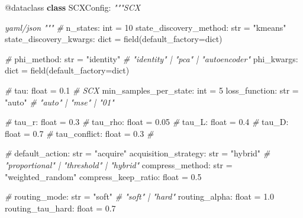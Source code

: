 \documentclass[
  12pt,
]{article}
\newenvironment{Shaded}{}{}
\newcommand{\AttributeTok}[1]{\textcolor[rgb]{0.49,0.56,0.16}{#1}}
\newcommand{\BuiltInTok}[1]{\textcolor[rgb]{0.00,0.50,0.00}{#1}}
\newcommand{\CommentTok}[1]{\textcolor[rgb]{0.38,0.63,0.69}{\textit{#1}}}
\newcommand{\DecValTok}[1]{\textcolor[rgb]{0.25,0.63,0.44}{#1}}
\newcommand{\FloatTok}[1]{\textcolor[rgb]{0.25,0.63,0.44}{#1}}
\newcommand{\KeywordTok}[1]{\textcolor[rgb]{0.00,0.44,0.13}{\textbf{#1}}}
\newcommand{\NormalTok}[1]{#1}
\newcommand{\OperatorTok}[1]{\textcolor[rgb]{0.40,0.40,0.40}{#1}}
\newcommand{\StringTok}[1]{\textcolor[rgb]{0.25,0.44,0.63}{#1}}
\begin{document}
\begin{Shaded}
\begin{Highlighting}[]
\AttributeTok{@dataclass}
\KeywordTok{class}\NormalTok{ SCXConfig:}
    \CommentTok{"""SCX }

\CommentTok{     yaml/json }
\CommentTok{    """}
    \CommentTok{\# }
\NormalTok{    n\_states: }\BuiltInTok{int} \OperatorTok{=} \DecValTok{10}
\NormalTok{    state\_discovery\_method: }\BuiltInTok{str} \OperatorTok{=} \StringTok{"kmeans"}
\NormalTok{    state\_discovery\_kwargs: }\BuiltInTok{dict} \OperatorTok{=}\NormalTok{ field(default\_factory}\OperatorTok{=}\BuiltInTok{dict}\NormalTok{)}

    \CommentTok{\# }
\NormalTok{    phi\_method: }\BuiltInTok{str} \OperatorTok{=} \StringTok{"identity"}   \CommentTok{\# "identity" | "pca" | "autoencoder"}
\NormalTok{    phi\_kwargs: }\BuiltInTok{dict} \OperatorTok{=}\NormalTok{ field(default\_factory}\OperatorTok{=}\BuiltInTok{dict}\NormalTok{)}

    \CommentTok{\# }
\NormalTok{    tau: }\BuiltInTok{float} \OperatorTok{=} \FloatTok{0.1}              \CommentTok{\# SCX }
\NormalTok{    min\_samples\_per\_state: }\BuiltInTok{int} \OperatorTok{=} \DecValTok{5}
\NormalTok{    loss\_function: }\BuiltInTok{str} \OperatorTok{=} \StringTok{"auto"}   \CommentTok{\# "auto" | "mse" | "01"}

    \CommentTok{\# }
\NormalTok{    tau\_r: }\BuiltInTok{float} \OperatorTok{=} \FloatTok{0.3}            \CommentTok{\# }
\NormalTok{    tau\_rho: }\BuiltInTok{float} \OperatorTok{=} \FloatTok{0.05}         \CommentTok{\# }
\NormalTok{    tau\_L: }\BuiltInTok{float} \OperatorTok{=} \FloatTok{0.4}            \CommentTok{\# }
\NormalTok{    tau\_D: }\BuiltInTok{float} \OperatorTok{=} \FloatTok{0.7}            \CommentTok{\# }
\NormalTok{    tau\_conflict: }\BuiltInTok{float} \OperatorTok{=} \FloatTok{0.3}     \CommentTok{\# }

    \CommentTok{\# }
\NormalTok{    default\_action: }\BuiltInTok{str} \OperatorTok{=} \StringTok{"acquire"}
\NormalTok{    acquisition\_strategy: }\BuiltInTok{str} \OperatorTok{=} \StringTok{"hybrid"}   \CommentTok{\# "proportional" | "threshold" | "hybrid"}
\NormalTok{    compress\_method: }\BuiltInTok{str} \OperatorTok{=} \StringTok{"weighted\_random"}
\NormalTok{    compress\_keep\_ratio: }\BuiltInTok{float} \OperatorTok{=} \FloatTok{0.5}

    \CommentTok{\# }
\NormalTok{    routing\_mode: }\BuiltInTok{str} \OperatorTok{=} \StringTok{"soft"}       \CommentTok{\# "soft" | "hard"}
\NormalTok{    routing\_alpha: }\BuiltInTok{float} \OperatorTok{=} \FloatTok{1.0}
\NormalTok{    routing\_tau\_hard: }\BuiltInTok{float} \OperatorTok{=} \FloatTok{0.7}


\end{Highlighting}
\end{Shaded}
\end{document}
